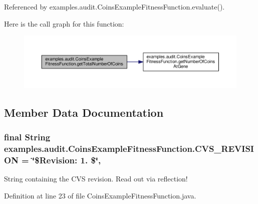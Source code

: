 Referenced by examples.\-audit.\-Coins\-Example\-Fitness\-Function.\-evaluate().



Here is the call graph for this function\-:
\nopagebreak
\begin{figure}[H]
\begin{center}
\leavevmode
\includegraphics[width=350pt]{classexamples_1_1audit_1_1_coins_example_fitness_function_a6737f37061b5800e64fea85f29c69471_cgraph}
\end{center}
\end{figure}




\subsection{Member Data Documentation}
\hypertarget{classexamples_1_1audit_1_1_coins_example_fitness_function_a6914d4d9f17508cf2c926e5c0e081fea}{
\subsubsection[{C\-V\-S\-\_\-\-R\-E\-V\-I\-S\-I\-O\-N}]{\setlength{\rightskip}{0pt plus 5cm}final String examples.\-audit.\-Coins\-Example\-Fitness\-Function.\-C\-V\-S\-\_\-\-R\-E\-V\-I\-S\-I\-O\-N = \char`\"{}\$Revision\-: 1. \$\char`\"{}\hspace{0.3cm}{\ttfamily [static]}, {\ttfamily [private]}}}\label{classexamples_1_1audit_1_1_coins_example_fitness_function_a6914d4d9f17508cf2c926e5c0e081fea}
String containing the C\-V\-S revision. Read out via reflection! 

Definition at line 23 of file Coins\-Example\-Fitness\-Function.\-java.

